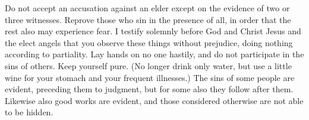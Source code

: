 \begin{biblechapter}
\verse Do not accept an accusation against an elder except on the evidence of two or three witnesses.
\verse Reprove those who sin in the presence of all, in order that the rest also may experience fear.
\verse I testify solemnly before God and Christ Jesus and the elect angels that you observe these things without prejudice, doing nothing according to partiality.
\verse Lay hands on no one hastily, and do not participate in the sins of others. Keep yourself pure.
\verse (No longer drink only water, but use a little wine for your stomach and your frequent illnesses.)
\verse The sins of some people are evident, preceding them to judgment, but for some also they follow after them.
\verse Likewise also good works are evident, and those considered otherwise are not able to be hidden.
\end{biblechapter}


